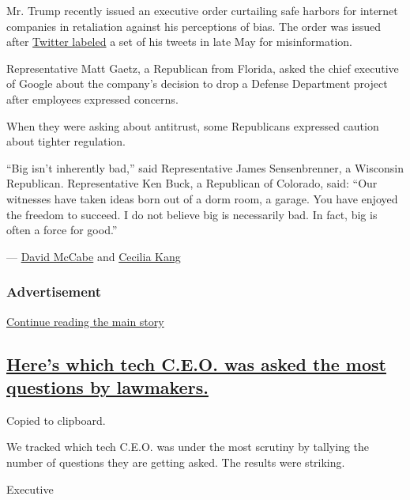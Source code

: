 Mr. Trump recently issued an executive order curtailing safe harbors for
internet companies in retaliation against his perceptions of bias. The
order was issued after
\href{https://slack-redir.net/link?url=https\%3A\%2F\%2Fwww.nytimes.com\%2F2020\%2F05\%2F26\%2Ftechnology\%2Ftwitter-trump-mail-in-ballots.html}{Twitter
labeled} a set of his tweets in late May for misinformation.

Representative Matt Gaetz, a Republican from Florida, asked the chief
executive of Google about the company's decision to drop a Defense
Department project after employees expressed concerns.

When they were asking about antitrust, some Republicans expressed
caution about tighter regulation.

``Big isn't inherently bad,'' said Representative James Sensenbrenner, a
Wisconsin Republican. Representative Ken Buck, a Republican of Colorado,
said: ``Our witnesses have taken ideas born out of a dorm room, a
garage. You have enjoyed the freedom to succeed. I do not believe big is
necessarily bad. In fact, big is often a force for good.''

--- \href{https://www.nytimes.com/by/david-mccabe}{David McCabe} and
\href{https://www.nytimes.com/by/cecilia-kang}{Cecilia Kang}

\hypertarget{advertisement}{%
\subsubsection{Advertisement}\label{advertisement}}

\protect\hyperlink{after-dfp-ad-mid1}{Continue reading the main story}

\hypertarget{heres-which-tech-ceo-was-asked-the-most-questions-by-lawmakers}{%
\subsection{\texorpdfstring{\protect\hyperlink{heres-which-tech-ceo-was-asked-the-most-questions-by-lawmakers}{Here's
which tech C.E.O. was asked the most questions by
lawmakers.}}{Here's which tech C.E.O. was asked the most questions by lawmakers.}}\label{heres-which-tech-ceo-was-asked-the-most-questions-by-lawmakers}}

Copied to clipboard.

We tracked which tech C.E.O. was under the most scrutiny by tallying the
number of questions they are getting asked. The results were striking.

Executive

